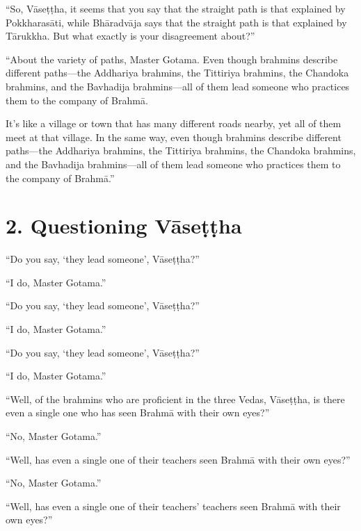 \documentclass[12pt,openany]{book}%
\begin{document}
“So, \textsanskrit{Vāseṭṭha}, it seems that you say that the straight path is that explained by \textsanskrit{Pokkharasāti}, while \textsanskrit{Bhāradvāja} says that the straight path is that explained by \textsanskrit{Tārukkha}. But what exactly is your disagreement about?” 

“About the variety of paths, Master Gotama. Even though brahmins describe different paths—the Addhariya brahmins, the Tittiriya brahmins, the Chandoka brahmins, and the Bavhadija brahmins—all of them lead someone who practices them to the company of \textsanskrit{Brahmā}. 

It’s like a village or town that has many different roads nearby, yet all of them meet at that village. In the same way, even though brahmins describe different paths—the Addhariya brahmins, the Tittiriya brahmins, the Chandoka brahmins, and the Bavhadija brahmins—all of them lead someone who practices them to the company of \textsanskrit{Brahmā}.” 

\section*{2. Questioning \textsanskrit{Vāseṭṭha} }

“Do you say, ‘they lead someone’, \textsanskrit{Vāseṭṭha}?” 

“I do, Master Gotama.” 

“Do you say, ‘they lead someone’, \textsanskrit{Vāseṭṭha}?” 

“I do, Master Gotama.” 

“Do you say, ‘they lead someone’, \textsanskrit{Vāseṭṭha}?” 

“I do, Master Gotama.” 

“Well, of the brahmins who are proficient in the three Vedas, \textsanskrit{Vāseṭṭha}, is there even a single one who has seen \textsanskrit{Brahmā} with their own eyes?” 

“No, Master Gotama.” 

“Well, has even a single one of their teachers seen \textsanskrit{Brahmā} with their own eyes?” 

“No, Master Gotama.” 

“Well, has even a single one of their teachers’ teachers seen \textsanskrit{Brahmā} with their own eyes?” 
\end{document}
